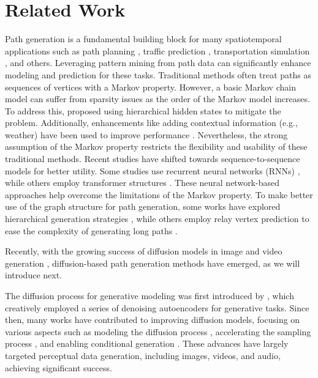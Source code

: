 \section{Related Work}
\label{sec:related}

Path generation is a fundamental building block for many spatiotemporal applications such as path planning \cite{NeurIPS23Xiao}, traffic prediction \cite{VLDB23Tian}, transportation simulation \cite{VLDB22Wang}, and others. 
Leveraging pattern mining from path data can significantly enhance modeling and prediction for these tasks.
Traditional methods often treat paths as sequences of vertices with a Markov property. 
However, a basic Markov chain model \cite{SuttonB98} can suffer from sparsity issues as the order of the Markov model increases. 
To address this, \cite{Ubicomp14Baratchi} proposed using hierarchical hidden states to mitigate the problem. 
Additionally, enhancements like adding contextual information (e.g., weather) have been used to improve performance \cite{TITS18Yin}.
Nevertheless, the strong assumption of the Markov property restricts the flexibility and usability of these traditional methods. 
Recent studies have shifted towards sequence-to-sequence models for better utility. 
Some studies use recurrent neural networks (RNNs) \cite{IJCAI17Wu}, while others employ transformer structures \cite{CIKM22Liang}. 
These neural network-based approaches help overcome the limitations of the Markov property.
To make better use of the graph structure for path generation, some works have explored hierarchical generation strategies \cite{KDD21Fu}, while others employ relay vertex prediction to ease the complexity of generating long paths \cite{VLDB22Wang}.

Recently, with the growing success of diffusion models in image and video generation \cite{ICCV23Peebles, CoRR24Esser}, diffusion-based path generation methods have emerged, as we will introduce next.


The diffusion process for generative modeling was first introduced by \cite{ICML15Dickstein}, which creatively employed a series of denoising autoencoders for generative tasks. 
Since then, many works have contributed to improving diffusion models, focusing on various aspects such as modeling the diffusion process \cite{NeurIPS20Ho, ICLR23Liu}, accelerating the sampling process \cite{ICLR21Song}, and enabling conditional generation \cite{CoRR24Ho}. 
These advances have largely targeted perceptual data generation, including images, videos, and audio, achieving significant success.

